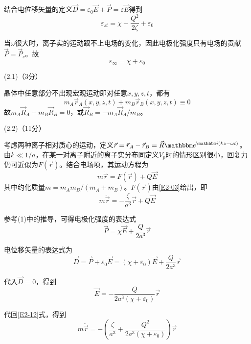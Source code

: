 \documentclass[10pt,a4paper,onecolumn,UTF8]{ctexart}
\begin{document}
	结合电位移矢量的定义$\vec D=\varepsilon_0\vec E+\vec P=\varepsilon\vec E$得到
	\begin{equation}\label{E2-08}
		\varepsilon_{st}=\chi+\frac{Q^2}{2\zeta}+\varepsilon_0
	\end{equation}
	
	当$\omega$很大时，离子实的运动跟不上电场的变化，因此电极化强度只有电场的贡献$\vec P=\vec P_e$。故
	\begin{equation}\label{E2-09}
		\varepsilon_{\infty}=\chi+\varepsilon_0
	\end{equation}
	
	(2.1)（3分）
	
	晶体中任意部分不出现宏观运动即对任意$x,y,z,t$，都有
	\begin{equation}\label{E2-10}
		m_A\vec r_A(x,y,z,t)+m_B\vec r_B(x,y,z,t)\equiv0
	\end{equation}
	故$m_A\vec R_A+m_B\vec R_B=0$，或$\vec R_B=-m_A\vec R_A/m_B$。
	
	(2.2)（11分）
	
	考虑两种离子相对质心的运动，定义$\vec r=\vec r_A-\vec r_B=\vec R\ue^{\ui(kz-\omega t)}$。由$k\ll 1/a$，在某一对离子附近的离子实分布同定义$V_p$时的情形区别很小，回复力仍可近似为$F(\vec r)$。结合电场项，其运动方程为
	\begin{equation}\label{E2-11}
		m\ddot{\vec r}=F(\vec r)+Q\vec E
	\end{equation}
	其中约化质量$m=m_Am_B/(m_A+m_B)$。$F(\vec r)$由\eqref{E2-03}给出，即
	\begin{equation}\label{E2-12}
		m\ddot{\vec r}=-\frac{\zeta}{a^3}\vec r+Q\vec E
	\end{equation}
	
	参考(1)中的推导，可得电极化强度的表达式
	\begin{equation}\label{E2-13}
		\vec P=\chi\vec E+\frac{Q}{2a^3}\vec r
	\end{equation}
	
	电位移矢量的表达式为
	\begin{equation}\label{E2-14}
		\vec D=\vec P+\varepsilon_0\vec E=(\chi+\varepsilon_0)\vec E+\frac{Q}{2a^3}\vec r
	\end{equation}
	
	代入$\vec D=0$，得到
	\begin{equation}\label{E2-15}
		\vec{E}=-\frac{Q}{2a^3(\chi+\varepsilon_0)}\vec r
	\end{equation}
	
	代回\eqref{E2-12}式，得到
	\begin{equation}\label{E2-16}
		m\ddot{\vec r}=-\left(\frac{\zeta}{a^3}+\frac{Q^2}{2a^3(\chi+\varepsilon_0)}\right)\vec r
	\end{equation}
	
\end{document}
